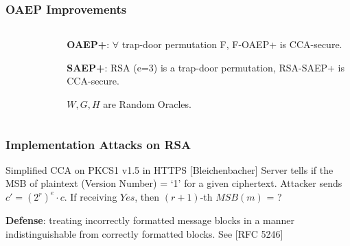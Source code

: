 \begin{comment}
\begin{frame}\frametitle{PKCK \#1 v2.1 (RSAES-OAEP) (Cont.)}
RSA-OAEP is CCA-secure in Random Oracle model. \footnote{It may not be secure when RO is instantiated.} [RFC 3447]
\begin{figure}
\begin{center}

\end{center}
\end{figure}
CPA: To learn $r$, attacker has to learn $\hat{m}_1$ from $(\hat{m}_1\|\hat{m})^e$\\

CCA: Effective decryption query is disabled by checking "00...0" in the plaintext before the response\\

\end{frame}
\end{comment}
\begin{frame}\frametitle{OAEP Improvements}
\begin{columns}
\begin{column}{5cm}
\begin{figure}
\begin{center}


\end{center}
\end{figure}
\end{column}
\begin{column}{5cm}
\textbf{OAEP+}: $\forall $ trap-door permutation F, F-OAEP+ is CCA-secure.\newline

\textbf{SAEP+}: RSA (e=3) is a trap-door permutation, RSA-SAEP+ is CCA-secure.\newline

$W, G, H$ are Random Oracles.
\end{column}
\end{columns}
\end{frame}
\begin{frame}\frametitle{Implementation Attacks on RSA}
\begin{exampleblock}{Simplified CCA on PKCS1 v1.5 in HTTPS [Bleichenbacher]}
Server tells if the MSB of plaintext (Version Number) = `1' for a given ciphertext. Attacker sends $c' = (2^{r})^{e}\cdot c$. If receiving $Yes$, then \alert{$(r+1)$-th $MSB(m)$ = ?}
\begin{figure}
\begin{center}

\end{center}
\end{figure}
\end{exampleblock}
\textbf{Defense}: treating incorrectly formatted message blocks in a manner indistinguishable from correctly formatted blocks. See [RFC 5246]
\end{frame}
